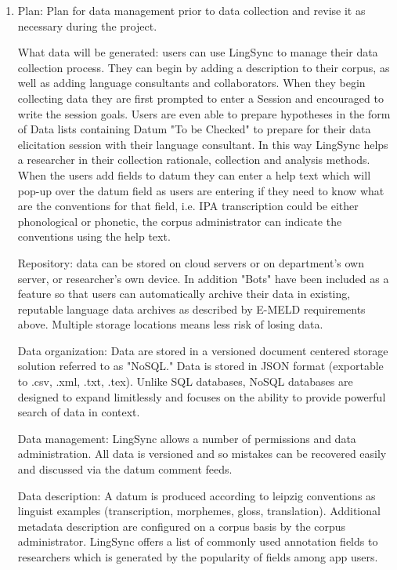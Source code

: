 \documentclass[letterpaper, 12pt, dvips]{mitwpl}
\begin{document}

\begin{enumerate} 

\item Plan: Plan for data management prior to data collection and revise it as necessary during the project. 


What data will be generated: users can use LingSync to manage their data collection process. They can begin by adding a description to their corpus, as well as adding language consultants and collaborators. When they begin collecting data they are first prompted to enter a Session and encouraged to write the session goals. Users are even able to prepare hypotheses in the form of Data lists containing Datum "To be Checked" to prepare for their data elicitation session with their language consultant. In this way LingSync helps a researcher in their collection rationale, collection and analysis methods. When the users add fields to datum they can enter a help text which will pop-up over the datum field as users are entering if they need to know what are the conventions for that field, i.e. IPA transcription could be either phonological or phonetic, the corpus administrator can indicate the conventions using the help text. 

Repository:  data can be stored on cloud servers or on department's own server, or researcher's own device. In addition "Bots" have been included as a feature so that users can automatically archive their data in existing, reputable language data archives as described by E-MELD requirements above. Multiple storage locations means less risk of losing data.

Data organization: Data are stored in a versioned document centered storage solution referred to as "NoSQL." Data is stored in JSON format (exportable to .csv, .xml, .txt, .tex). Unlike SQL databases, NoSQL databases are designed to expand limitlessly and focuses on the ability to provide powerful search of data in context.

Data management: LingSync allows a number of permissions and data administration. All data is versioned and so mistakes can be recovered easily and discussed via the datum comment feeds. 

Data description: A datum is produced according to leipzig conventions as linguist examples (transcription, morphemes, gloss, translation). Additional metadata description are configured on a corpus basis by the corpus administrator. LingSync offers a list of commonly used annotation fields to researchers which is generated by the popularity of fields among app users. 


\end{enumerate}
\end{document}
